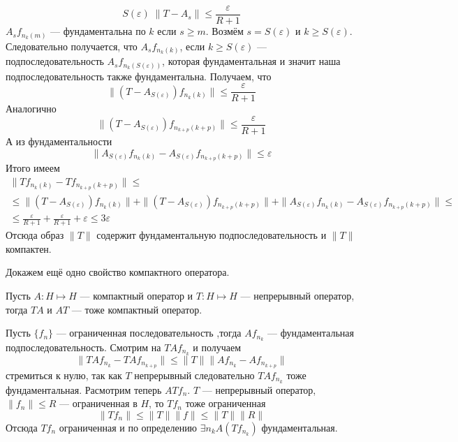 \documentclass[12pt]{article}
\begin{document}
\begin{Proof}
$$    S(\varepsilon)\; \|T - A_s\| \le \dfrac{\varepsilon}{R + 1}
    $$
    $A_s f_{n_k(m)}$ --- фундаментальна по $k$ если $s \ge m$.
    Возмём $s = S(\varepsilon)$ и $k \ge S(\varepsilon)$.
    Следовательно получается, что $A_s f_{n_k(k)}$, если $k \ge S(\varepsilon)
    $ --- подпоследовательность $A_s f_{n_k(S(\varepsilon))}$, которая
    фундаментальная и значит наша подпоследовательность также фундаментальна.
    Получаем, что 
    $$
    \|(T - A_{S(\varepsilon)})f_{n_k(k)}\| \le \frac{\varepsilon}{R + 1}
    $$ 
    Аналогично
    $$
    \|(T - A_{S(\varepsilon)})f_{n_{k + p}(k + p)}\| \le \frac{\varepsilon}{
    R + 1}
    $$
    А из фундаментальности
    $$
    \|A_{S(\varepsilon)}f_{n_k(k)} - A_{S(\varepsilon)}f_{n_{k + p}(k + p)}
    \| \le \varepsilon
    $$
    Итого имеем
    \begin{multline*}
        \|T f_{n_k(k)} - T f_{n_{k + p}(k + p)}\| \le \\
        \le \|(T - A_{S(\varepsilon)})f_{n_k(k)}\| + 
        \|(T - A_{S(\varepsilon)})f_{n_{k + p}(k + p)}\| +
        \|A_{S(\varepsilon)}f_{n_k(k)} - A_{S(\varepsilon)}
        f_{n_{k + p}(k + p)}\| \le \\
        \le \frac{\varepsilon}{R + 1} + \frac{\varepsilon}{R + 1} + 
        \varepsilon \le 3 \varepsilon
    \end{multline*}
    Отсюда образ $\|T\|$ содержит фундаментальную подпоследовательность и
    $\|T\|$ компактен.
\end{Proof}

Докажем ещё одно свойство компактного оператора.
\begin{Utv}
    Пусть $A : H \mapsto H$ --- компактный оператор и $T : H \mapsto H$ --- 
    непрерывный оператор, тогда $TA$ и $AT$ --- тоже компактный оператор.
\end{Utv}
\begin{Proof}
    Пусть $\{f_n\}$ --- ограниченная последовательность ,тогда 
    $A f_{n_k}$ --- фундаментальная подпоследовательность.
    Смотрим на $T A f_{n_k}$ и получаем
    $$
    \|T A f_{n_k} - T A f_{n_{k + p}}\| \le \|T\|
    \|A f_{n_k} - A f_{n_{k + p}}\|
    $$
    стремиться к нулю, так как $T$ непрерывный следовательно $T A f_{n_k}$
    тоже фундаментальная.
    Расмотрим теперь $A T f_n$.
    $T$ --- непрерывный оператор, $\|f_n\| \le R$ --- ограниченная в $H$, то
    $T f_n$ тоже ограниченная
    $$
    \|T f_n\| \le \|T\| \|f\| \le \|T\| \|R\|
    $$
    Отсюда $T f_n$ ограниченная и по определению $\exists n_k A(T f_{n_k})$
    фундаментальная.
\end{Proof}
\end{document}
